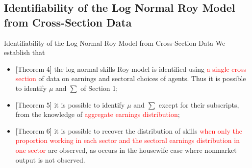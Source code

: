 \documentclass{beamer}
\begin{document}
\subsection{Identifiability of the Log Normal Roy Model from Cross-Section Data}
\begin{frame}{Identifiability of the Log Normal Roy Model from Cross-Section Data}
We establish that
	\begin{itemize}
		\item {[Theorem 4]} the log normal skills Roy model is identified using \textcolor{red}{a single cross-section} of data on earnings and sectoral choices of agents. Thus it is possible to identify $\mu$ and $\sum$ of Section 1;
		\item {[Theorem 5]} it is possible to identify $\mu$ and $\sum$ except for their subscripts, from the knowledge of \textcolor{red}{aggregate earnings distribution};
		\item {[Theorem 6]} it is possible to recover the distribution of skills \textcolor{red}{when only the proportion working in each sector and the sectoral earnings distribution in one sector} are observed, as occurs in the housewife case where nonmarket output is not observed.
	\end{itemize}
\end{frame}
\end{document}
